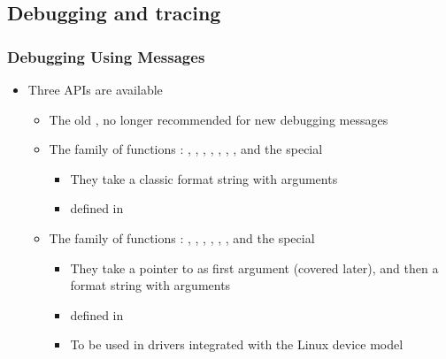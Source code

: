 \subsection{Debugging and tracing}

\begin{frame}
  \frametitle{Debugging Using Messages}
  \begin{itemize}
  \item Three APIs are available
    \begin{itemize}
    \item The old , no longer recommended for new debugging
      messages
    \item The  family of functions : ,
      , , ,
      , , ,
       and the special 
      \begin{itemize}
      \item They take a classic format string with arguments
      \item defined in 
      \end{itemize}
    \item The  family of functions : ,
      , , ,
      , ,  and
      the special 
      \begin{itemize}
      \item They take a pointer to  as first
        argument (covered later), and then a format string with
        arguments
      \item defined in 
      \item To be used in drivers integrated with the Linux device
        model
      \end{itemize}
    \end{itemize}
  \end{itemize}
\end{frame}

